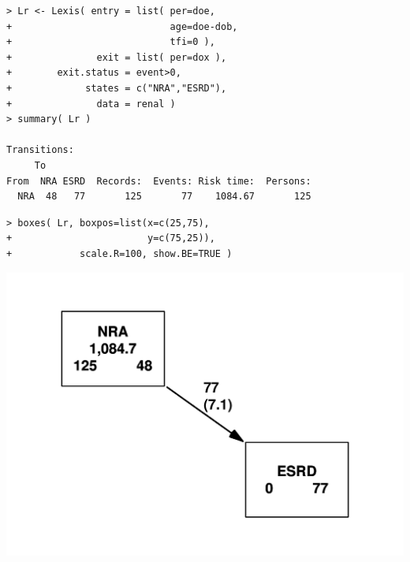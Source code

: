 \begin{frame}[fragile]
\renewcommand{\baselinestretch}{0.8}
\footnotesize
\begin{verbatim}
> Lr <- Lexis( entry = list( per=doe,
+                            age=doe-dob,
+                            tfi=0 ),
+               exit = list( per=dox ),
+        exit.status = event>0,
+             states = c("NRA","ESRD"),
+               data = renal )
> summary( Lr )

Transitions:
     To
From  NRA ESRD  Records:  Events: Risk time:  Persons:
  NRA  48   77       125       77    1084.67       125
\end{verbatim}
\normalsize
\renewcommand{\baselinestretch}{1.0}
\end{frame}

\begin{frame}[fragile]
\renewcommand{\baselinestretch}{0.8}
\footnotesize
\begin{verbatim}
> boxes( Lr, boxpos=list(x=c(25,75),
+                        y=c(75,25)),
+            scale.R=100, show.BE=TRUE )
\end{verbatim}
\normalsize
\renewcommand{\baselinestretch}{1.0}
\begin{center}
\includegraphics[height=0.8\textheight,keepaspectratio]{./NRA-mort}
\end{center}
\end{frame}

